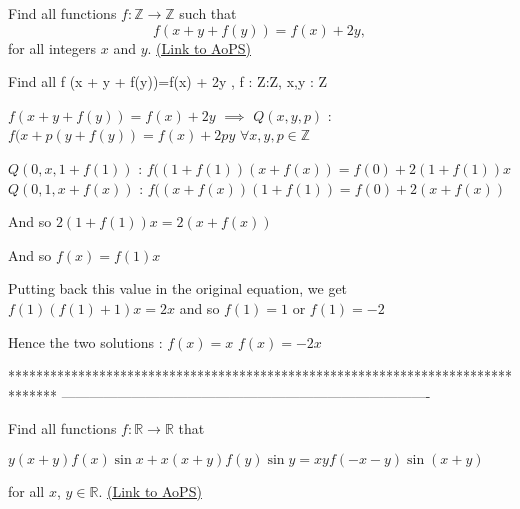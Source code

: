 \begin{problem}
	Find all functions $f: \mathbb Z \to \mathbb Z$  such that \[f(x + y + f(y))=f(x) + 2y ,\] for all integers $x$ and $y$.
	\flushright \href{https://artofproblemsolving.com/community/c6h226387}{(Link to AoPS)}
\end{problem}



\begin{solution}
	\begin{tcolorbox}Find all f (x + y + f(y))=f(x) + 2y , f : Z:Z, x,y : Z\end{tcolorbox}

$ f(x+y+f(y))=f(x)+2y$ $ \implies$ $ Q(x,y,p)$ : $ f(x+p(y+f(y))=f(x)+2py$ $ \forall x, y, p\in\mathbb Z$

$ Q(0,x,1+f(1))$ : $ f((1+f(1))(x+f(x))=f(0)+2(1+f(1))x$
$ Q(0,1,x+f(x))$ : $ f((x+f(x))(1+f(1))=f(0)+2(x+f(x))$

And so $ 2(1+f(1))x=2(x+f(x))$

And so $ f(x)=f(1)x$

Putting back this value in the original equation, we get $ f(1)(f(1)+1)x=2x$ and so $ f(1)=1$ or $ f(1)=-2$

Hence the two solutions :
$ f(x)=x$
$ f(x)=-2x$
\end{solution}
*******************************************************************************
-------------------------------------------------------------------------------

\begin{problem}
	Find all functions $ f: \mathbb{R}\to\mathbb{R}$ that 

$ y(x+y)f(x)\sin{x}+x(x+y)f(y)\sin{y}=xyf(-x-y)\sin{(x+y)}$ 

for all $ x$, $ y\in\mathbb{R}$.
	\flushright \href{https://artofproblemsolving.com/community/c6h228323}{(Link to AoPS)}
\end{problem}



